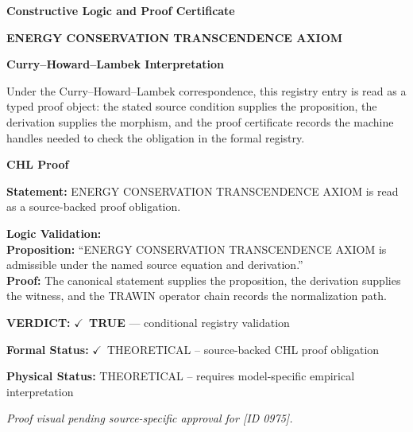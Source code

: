 \clearpage
\begingroup\tzpsupportsetup
\noindent\textbf{\fontsize{10.8pt}{12.8pt}\selectfont [ID 0975] Constructive Logic and Proof Certificate}\par
\noindent\textbf{\fontsize{10pt}{12pt}\selectfont ENERGY CONSERVATION TRANSCENDENCE AXIOM}\par
\vspace{0.45em}
\begingroup
\footnotesize
\setlength{\parskip}{0.22em}
\setlength{\parindent}{0pt}
\noindent\textbf{Curry--Howard--Lambek Interpretation}\par
Under the Curry--Howard--Lambek correspondence, this registry entry is read as a typed proof
object: the stated source condition supplies the proposition, the derivation supplies the
morphism, and the proof certificate records the machine handles needed to check the obligation
in the formal registry.

\vspace{0.45em}
\noindent\textbf{CHL Proof}\par
\textbf{Statement:} ENERGY CONSERVATION TRANSCENDENCE AXIOM is read as a source-backed proof obligation.

\textbf{Logic Validation:}\\
\textbf{Proposition:} ``ENERGY CONSERVATION TRANSCENDENCE AXIOM is admissible under the named source equation and derivation.''\\
\textbf{Proof:} The canonical statement supplies the proposition, the derivation supplies the witness, and the TRAWIN operator chain records the normalization path.

\textbf{VERDICT:} \ensuremath{\checkmark}\ \textbf{TRUE} --- conditional registry validation

\textbf{Formal Status:} \ensuremath{\checkmark}\ THEORETICAL -- source-backed CHL proof obligation

\textbf{Physical Status:} THEORETICAL -- requires model-specific empirical interpretation
\par\vspace{0.45em}
\par
\vfill
\begingroup\footnotesize\itshape
Proof visual pending source-specific approval for [ID 0975].
\par\endgroup
\vfill
\endgroup
\endgroup
